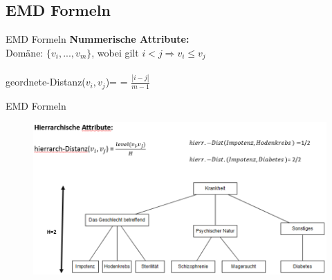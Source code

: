 \subsection{EMD Formeln} 
\begin{frame}{EMD Formeln}
	\textbf{Nummerische Attribute:} \\
	Domäne: $\{v_i,...,v_m\}$, wobei gilt $i<j \Rightarrow v_i \le v_j$\\
	\ \\
	geordnete-Distanz($v_i,v_j$)= = $\frac{|i-j|}{m-1}$
\end{frame}
\begin{frame}{EMD Formeln}
	\begin{figure}
		\includegraphics[scale=0.45]{pic/EMD_Formel.png}
	\end{figure}
\end{frame}
